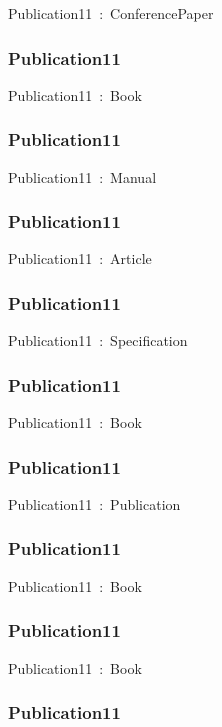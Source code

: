\documentclass{article}
\begin{document}
Publication11~:~ConferencePaper

\subsubsection*{Publication11}

Publication11~:~Book

\subsubsection*{Publication11}

Publication11~:~Manual

\subsubsection*{Publication11}

Publication11~:~Article

\subsubsection*{Publication11}

Publication11~:~Specification

\subsubsection*{Publication11}

Publication11~:~Book

\subsubsection*{Publication11}

Publication11~:~Publication

\subsubsection*{Publication11}

Publication11~:~Book

\subsubsection*{Publication11}

Publication11~:~Book

\subsubsection*{Publication11}
\end{document}
